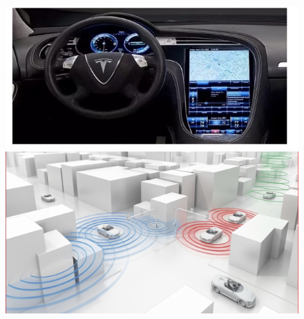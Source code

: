 \begin{figure}[H]
\centering
\includegraphics[width=.6\textwidth]{figures/AutomatedDriving1}\\
\includegraphics[width=.6\textwidth]{figures/AutomatedDriving2}
\end{figure}


